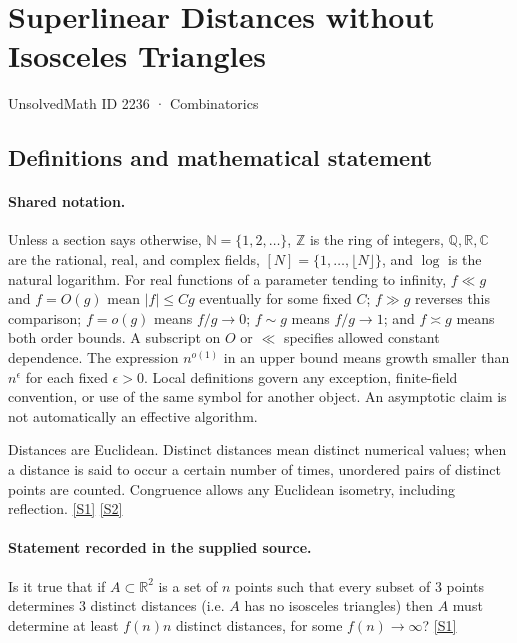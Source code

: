 \documentclass[11pt,a4paper]{article}
\newcommand{\N}{\mathbb{N}}
\newcommand{\Z}{\mathbb{Z}}
\newcommand{\Q}{\mathbb{Q}}
\newcommand{\R}{\mathbb{R}}
\newcommand{\C}{\mathbb{C}}
\newcommand{\sref}[2]{\hyperlink{source:#1:#2}{[S#2]}}
\begin{document}

\setcounter{section}{2235}

\section{Superlinear Distances without Isosceles Triangles}\label{2236}

{\small\sffamily UnsolvedMath ID 2236 · Combinatorics}

\subsection{Definitions and mathematical statement}

\paragraph{Shared notation.}Unless a section says otherwise, $\N=\{1,2,\ldots\}$,
$\Z$ is the ring of integers, $\Q,\R,\C$ are the rational, real, and complex
fields, $[N]=\{1,\ldots,\lfloor N\rfloor\}$, and $\log$ is the natural
logarithm. For real functions of a parameter tending to infinity,
$f\ll g$ and $f=O(g)$ mean $|f|\leq Cg$ eventually for some fixed $C$;
$f\gg g$ reverses this comparison; $f=o(g)$ means $f/g\to0$;
$f\sim g$ means $f/g\to1$; and $f\asymp g$ means both order bounds.
A subscript on $O$ or $\ll$ specifies allowed constant dependence.
The expression $n^{o(1)}$ in an upper bound means growth smaller than
$n^\epsilon$ for each fixed $\epsilon>0$. Local definitions govern any
exception, finite-field convention, or use of the same symbol for another
object. An asymptotic claim is not automatically an effective algorithm.



Distances are Euclidean. Distinct distances mean distinct numerical values; when a distance is said to occur a certain number of times, unordered pairs of distinct points are counted. Congruence allows any Euclidean isometry, including reflection. \sref{2236}{1} \sref{2236}{2}

\paragraph{Statement recorded in the supplied source.}
Is it true that if $A\subset \mathbb{R}^2$ is a set of $n$ points such that every subset of $3$ points determines $3$ distinct distances (i.e. $A$ has no isosceles triangles) then $A$ must determine at least $f(n)n$ distinct distances, for some $f(n)\to \infty$? \sref{2236}{1}
\end{document}
